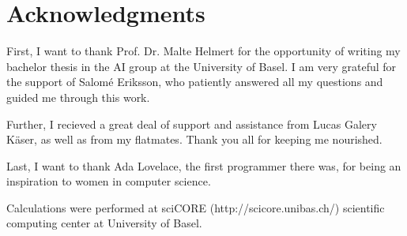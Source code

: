 \chapter{Acknowledgments}\label{ch:acknowledgments}
First, I want to thank Prof. Dr. Malte Helmert for the opportunity of writing my bachelor thesis in the AI group at the University of Basel.
I am very grateful for the support of Salom\'e Eriksson, who patiently answered all my questions and guided me through this work.

Further, I recieved a great deal of support and assistance from Lucas Galery K\"aser, as well as from my flatmates.
Thank you all for keeping me nourished.

Last, I want to thank Ada Lovelace, the first programmer there was, for being an inspiration to women in computer science.

Calculations were performed at sciCORE (http://scicore.unibas.ch/) scientific computing center at University of Basel.